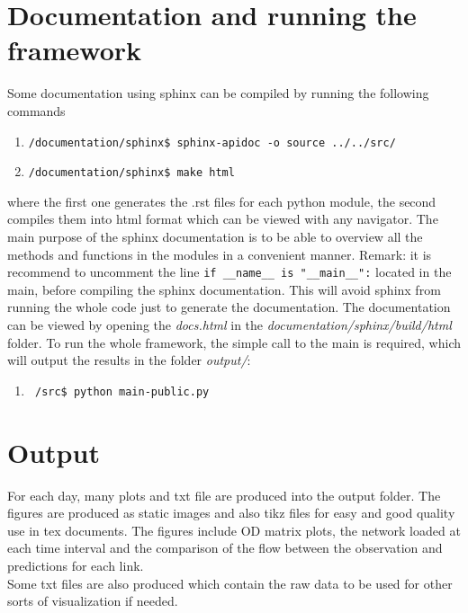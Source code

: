 \documentclass[a4paper,12pt]{article}
\begin{document}
\section{Documentation and running the framework}
Some documentation using sphinx can be compiled by running the following commands
\begin{enumerate}
\item \begin{verbatim}/documentation/sphinx$ sphinx-apidoc -o source ../../src/ \end{verbatim}
\item \begin{verbatim}/documentation/sphinx$ make html \end{verbatim}
\end{enumerate}
where the first one generates the .rst files for each python module, the second compiles them into html format which can be viewed with any navigator. The main purpose of the sphinx documentation is to be able to overview all the methods and functions in the modules in a convenient manner. Remark: it is recommend to uncomment the line \verb+if __name__ is "__main__":+ located in the main, before compiling the sphinx documentation. This will avoid sphinx from running the whole code just to generate the documentation. The documentation can be viewed by opening the \textit{docs.html} in the \textit{documentation/sphinx/build/html} folder.
To run the whole framework, the simple call to the main is required, which will output the results in the folder \textit{output/}:
\begin{enumerate}\item\begin{verbatim} /src$ python main-public.py \end{verbatim}\end{enumerate}

\section{Output}
For each day, many plots and txt file are produced into the output folder. The figures are produced as static images and also tikz files for easy and good quality use in tex documents. The figures include OD matrix plots, the network loaded at each time interval and the comparison of the flow between the observation and predictions for each link.\\
Some txt files are also produced which contain the raw data to be used for other sorts of visualization if needed.

%
%
\end{document}
